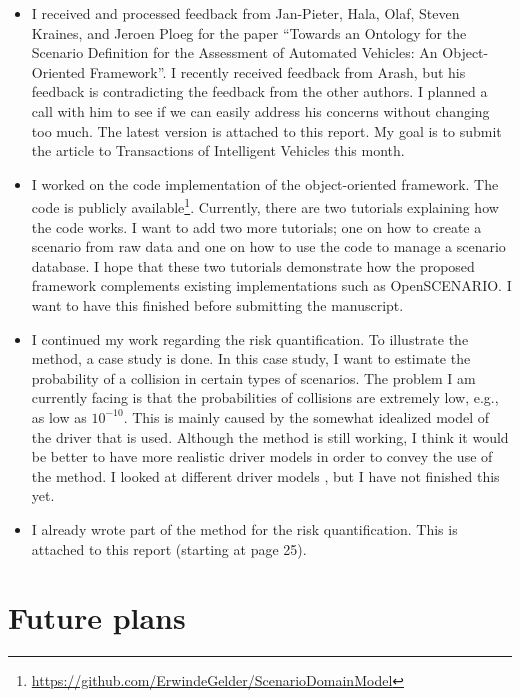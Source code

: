 \documentclass[10pt,final,a4paper,oneside,onecolumn]{article}
\begin{document}
\begin{itemize}
	\item I received and processed feedback from Jan-Pieter, Hala, Olaf, Steven Kraines, and Jeroen Ploeg for the paper ``Towards an Ontology for the Scenario Definition for the Assessment of Automated Vehicles: An Object-Oriented Framework''. I recently received feedback from Arash, but his feedback is contradicting the feedback from the other authors. I planned a call with him to see if we can easily address his concerns without changing too much. The latest version is attached to this report. My goal is to submit the article to Transactions of Intelligent Vehicles this month.
	
	\item I worked on the code implementation of the object-oriented framework. The code is publicly available\footnote{\url{https://github.com/ErwindeGelder/ScenarioDomainModel}}. Currently, there are two tutorials explaining how the code works. I want to add two more tutorials; one on how to create a scenario from raw data and one on how to use the code to manage a scenario database. I hope that these two tutorials demonstrate how the proposed framework complements existing implementations such as OpenSCENARIO. I want to have this finished before submitting the manuscript.
	
	\item I continued my work regarding the risk quantification. To illustrate the method, a case study is done. In this case study, I want to estimate the probability of a collision in certain types of scenarios. The problem I am currently facing is that the probabilities of collisions are extremely low, e.g., as low as $10^{-10}$. This is mainly caused by the somewhat idealized model of the driver that is used. Although the method is still working, I think it would be better to have more realistic driver models in order to convey the use of the method. I looked at different driver models \autocite{hamdar2008modeling, hamdar2015behavioral}, but I have not finished this yet.
	
	\item I already wrote part of the method for the risk quantification. This is attached to this report (starting at page 25).
\end{itemize}

\section{Future plans}
\end{document}

